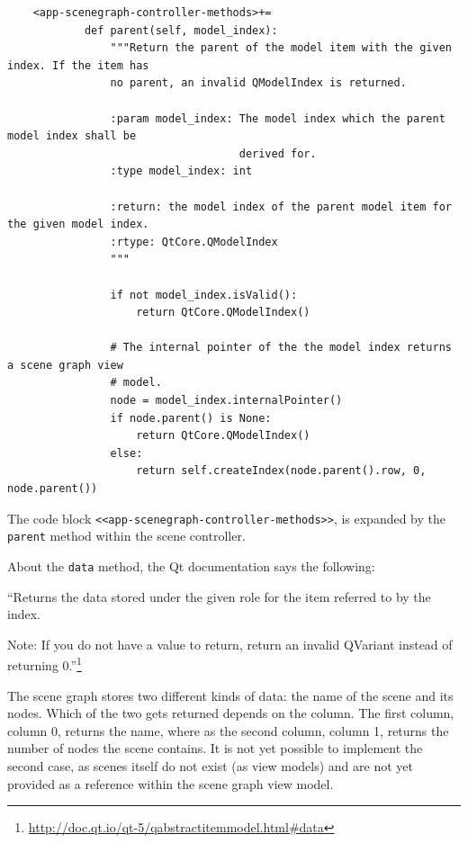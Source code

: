 \documentclass[10pt, openright, notitlepage]{scrreprt}
\begin{document}
\begin{listing}[H]
\begin{verbatim}
    <app-scenegraph-controller-methods>+=
            def parent(self, model_index):
                """Return the parent of the model item with the given index. If the item has
                no parent, an invalid QModelIndex is returned.
            
                :param model_index: The model index which the parent model index shall be
                                    derived for.
                :type model_index: int
            
                :return: the model index of the parent model item for the given model index.
                :rtype: QtCore.QModelIndex
                """
            
                if not model_index.isValid():
                    return QtCore.QModelIndex()
            
                # The internal pointer of the the model index returns a scene graph view
                # model.
                node = model_index.internalPointer()
                if node.parent() is None:
                    return QtCore.QModelIndex()
                else:
                    return self.createIndex(node.parent().row, 0, node.parent())
\end{verbatim}
\caption{\label{lst:app-scenegraph-controller-methods-03}
The code block \texttt{<<app-scenegraph-controller-methods>>}, is expanded by the \texttt{parent} method within the scene controller.}
\end{listing}

About the \texttt{data} method, the Qt documentation says the following:

``Returns the data stored under the given role for the item referred to by the
index.

Note: If you do not have a value to return, return an invalid QVariant instead
of returning
0.''\footnote{\url{http://doc.qt.io/qt-5/qabstractitemmodel.html\#data}}

The scene graph stores two different kinds of data: the name of the scene and its
nodes. Which of the two gets returned depends on the column. The first column,
column 0, returns the name, where as the second column, column 1, returns the
number of nodes the scene contains. It is not yet possible to implement the
second case, as scenes itself do not exist (as view models) and are not yet
provided as a reference within the scene graph view model.
\end{document}
